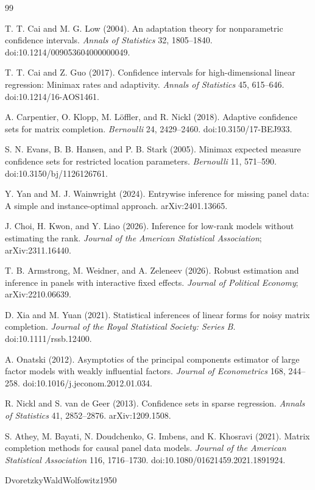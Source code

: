 \documentclass{article}
\begin{document}
\begin{thebibliography}{99}

   T. T. Cai and M. G. Low (2004). An adaptation theory for nonparametric confidence intervals. \textit{Annals of Statistics} 32, 1805--1840. doi:10.1214/009053604000000049.

   T. T. Cai and Z. Guo (2017). Confidence intervals for high-dimensional linear regression: Minimax rates and adaptivity. \textit{Annals of Statistics} 45, 615--646. doi:10.1214/16-AOS1461.

   A. Carpentier, O. Klopp, M. Löffler, and R. Nickl (2018). Adaptive confidence sets for matrix completion. \textit{Bernoulli} 24, 2429--2460. doi:10.3150/17-BEJ933.

   S. N. Evans, B. B. Hansen, and P. B. Stark (2005). Minimax expected measure confidence sets for restricted location parameters. \textit{Bernoulli} 11, 571--590. doi:10.3150/bj/1126126761.

   Y. Yan and M. J. Wainwright (2024). Entrywise inference for missing panel data: A simple and instance-optimal approach. arXiv:2401.13665.

   J. Choi, H. Kwon, and Y. Liao (2026). Inference for low-rank models without estimating the rank. \textit{Journal of the American Statistical Association}; arXiv:2311.16440.

   T. B. Armstrong, M. Weidner, and A. Zeleneev (2026). Robust estimation and inference in panels with interactive fixed effects. \textit{Journal of Political Economy}; arXiv:2210.06639.

   D. Xia and M. Yuan (2021). Statistical inferences of linear forms for noisy matrix completion. \textit{Journal of the Royal Statistical Society: Series B}. doi:10.1111/rssb.12400.

   A. Onatski (2012). Asymptotics of the principal components estimator of large factor models with weakly influential factors. \textit{Journal of Econometrics} 168, 244--258. doi:10.1016/j.jeconom.2012.01.034.

   R. Nickl and S. van de Geer (2013). Confidence sets in sparse regression. \textit{Annals of Statistics} 41, 2852--2876. arXiv:1209.1508.

   S. Athey, M. Bayati, N. Doudchenko, G. Imbens, and K. Khosravi (2021). Matrix completion methods for causal panel data models. \textit{Journal of the American Statistical Association} 116, 1716--1730. doi:10.1080/01621459.2021.1891924.

   DvoretzkyWaldWolfowitz1950

\end{thebibliography}
\end{document}
